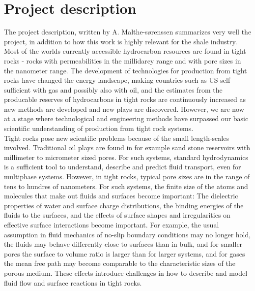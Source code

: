 \section{Project description}
The project description, written by A. Malthe-s{\o}renssen summarizes very well the project, in addition to how this work is highly relevant for the shale industry.\\
Most of the worlds currently accessible hydrocarbon resources are found in tight rocks - rocks with permeabilities in the millidarcy range and with pore sizes in the nanometer range. The development of technologies for production from tight rocks have changed the energy landscape, making countries such as US self-sufficient with gas and possibly also with oil, and the estimates from the producable reserves of hydrocarbons in tight rocks are continuously increased as new methods are developed and new plays are discovered. However, we are now at a stage where technological and engineering methods have surpassed our basic scientific understanding of production from tight rock systems.\\
Tight rocks pose new scientific problems because of the small length-scales involved. Traditional oil plays are found in for example sand stone reservoirs with millimeter to micrometer sized pores. For such systems, standard hydrodynamics is a sufficient tool to understand, describe and predict fluid transport, even for multiphase systems. However, in tight rocks, typical pore sizes are in the range of tens to hundres of nanometers. For such systems, the finite size of the atoms and molecules that make out fluids and surfaces become important: The dielectric properties of water and surface charge distributions, the binding energies of the fluids to the surfaces, and the effects of surface shapes and irregularities on effective surface interactions become important. For example, the usual assumption in fluid mechanics of no-slip boundary conditions may no longer hold, the fluids may behave differently close to surfaces than in bulk, and for smaller pores the surface to volume ratio is larger than for larger systems, and for gases the mean free path may become comparable to the characteristic sizes of the porous medium. These effects introduce challenges in how to describe and model fluid flow and surface reactions in tight rocks.\\
